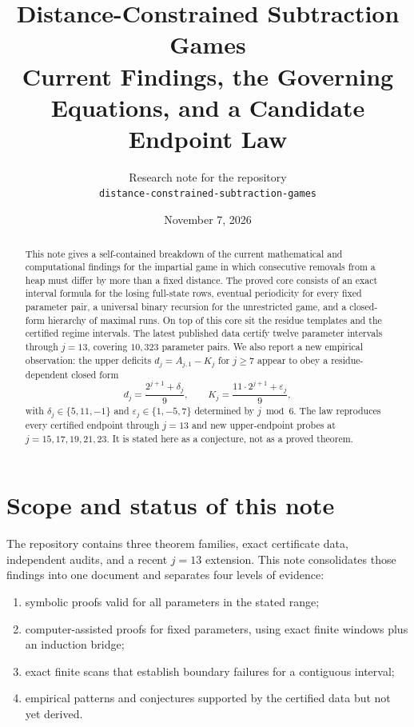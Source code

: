 \documentclass[11pt]{article}
\title{Distance-Constrained Subtraction Games\\[4pt]
\large Current Findings, the Governing Equations, and a Candidate Endpoint Law}
\author{Research note for the repository\\
\texttt{distance-constrained-subtraction-games}}
\date{November 7, 2026}
\theoremstyle{remark}
\begin{document}
\maketitle

\begin{abstract}
This note gives a self-contained breakdown of the current mathematical and computational findings for the impartial game in which consecutive removals from a heap must differ by more than a fixed distance. The proved core consists of an exact interval formula for the losing full-state rows, eventual periodicity for every fixed parameter pair, a universal binary recursion for the unrestricted game, and a closed-form hierarchy of maximal runs. On top of this core sit the residue templates and the certified regime intervals. The latest published data certify twelve parameter intervals through \(j=13\), covering \(10{,}323\) parameter pairs. We also report a new empirical observation: the upper deficits \(d_j=A_{j,1}-K_j\) for \(j\ge 7\) appear to obey a residue-dependent closed form
\[
d_j=\frac{2^{j+1}+\delta_j}{9},
\qquad
K_j=\frac{11\cdot 2^{j+1}+\varepsilon_j}{9},
\]
with \(\delta_j\in\{5,11,-1\}\) and \(\varepsilon_j\in\{1,-5,7\}\) determined by \(j\bmod 6\). The law reproduces every certified endpoint through \(j=13\) and new upper-endpoint probes at \(j=15,17,19,21,23\). It is stated here as a conjecture, not as a proved theorem.
\end{abstract}

\tableofcontents

\section{Scope and status of this note}

The repository contains three theorem families, exact certificate data, independent audits, and a recent \(j=13\) extension. This note consolidates those findings into one document and separates four levels of evidence:
\begin{enumerate}[label=(\roman*)]
\item symbolic proofs valid for all parameters in the stated range;
\item computer-assisted proofs for fixed parameters, using exact finite windows plus an induction bridge;
\item exact finite scans that establish boundary failures for a contiguous interval;
\item empirical patterns and conjectures supported by the certified data but not yet derived.
\end{enumerate}
\end{document}

